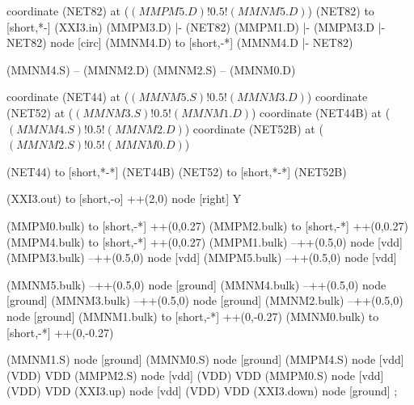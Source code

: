 \begin{circuitikz}[american]
	coordinate (NET82) at ($(MMPM5.D)!0.5!(MMNM5.D)$)
	(NET82) to [short,*-] (XXI3.in)
	(MMPM3.D) |- (NET82) 
	(MMPM1.D) |- (MMPM3.D |- NET82) node [circ] {}
	(MMNM4.D) to [short,-*] (MMNM4.D |- NET82) 
	
	(MMNM4.S) -- (MMNM2.D)
	(MMNM2.S) -- (MMNM0.D)
	
	coordinate (NET44) at ($(MMNM5.S)!0.5!(MMNM3.D)$)
	coordinate (NET52) at ($(MMNM3.S)!0.5!(MMNM1.D)$)
	coordinate (NET44B) at ($(MMNM4.S)!0.5!(MMNM2.D)$)
	coordinate (NET52B) at ($(MMNM2.S)!0.5!(MMNM0.D)$)
	
	(NET44) to [short,*-*] (NET44B)
	(NET52) to [short,*-*] (NET52B)	
	
	(XXI3.out) to [short,-o] ++(2,0) node [right] {Y}
	
	(MMPM0.bulk) to [short,-*] ++(0,0.27)
	(MMPM2.bulk) to [short,-*] ++(0,0.27)	
	(MMPM4.bulk) to [short,-*] ++(0,0.27)	
	(MMPM1.bulk) --++(0.5,0) node [vdd]{}
	(MMPM3.bulk) --++(0.5,0) node [vdd]{}
	(MMPM5.bulk) --++(0.5,0) node [vdd]{}
	
	
	(MMNM5.bulk) --++(0.5,0) node [ground]{}
	(MMNM4.bulk) --++(0.5,0) node [ground]{}
	(MMNM3.bulk) --++(0.5,0) node [ground]{}
	(MMNM2.bulk) --++(0.5,0) node [ground]{}
	(MMNM1.bulk) to [short,-*] ++(0,-0.27)
	(MMNM0.bulk) to [short,-*] ++(0,-0.27)


	(MMNM1.S) node [ground] {}
	(MMNM0.S) node [ground] {}
	(MMPM4.S) node [vdd] (VDD) {VDD}
	(MMPM2.S) node [vdd] (VDD) {VDD}
	(MMPM0.S) node [vdd] (VDD) {VDD}
	(XXI3.up) node [vdd] (VDD) {VDD}
	(XXI3.down) node [ground] {}
;

\end{circuitikz}
